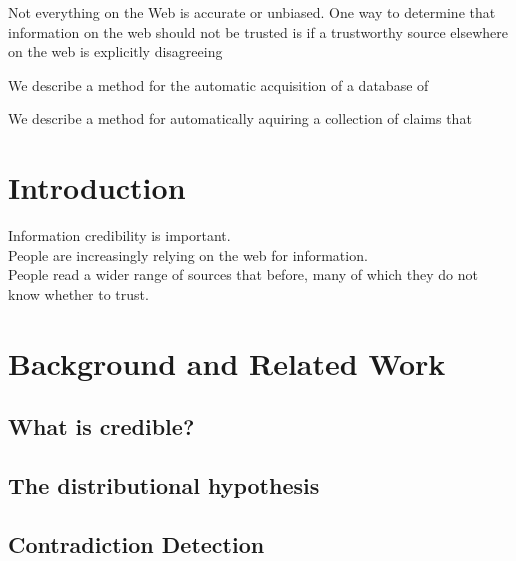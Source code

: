\documentclass{www2010-submission}
\newcommand{\todo}[1]{}
\newcommand{\x}[1]{{\color{blue} #1}\\}
\begin{document}

Not everything on the Web is accurate or unbiased. One way to determine that information on the web should not be trusted is if a trustworthy source elsewhere on the web is explicitly disagreeing 

We describe a method for the automatic acquisition of a database of 

We describe a method for automatically aquiring a collection of claims that 







\section{Introduction}

\x{Information credibility is important.}
\x{People are increasingly relying on the web for information.}
\x{People read a wider range of sources that before, many of which they do not know whether to trust.}

\section{Background and Related Work}

\subsection{What is credible?}


\subsection{The distributional hypothesis}

\subsection{Contradiction Detection}
\end{document}
